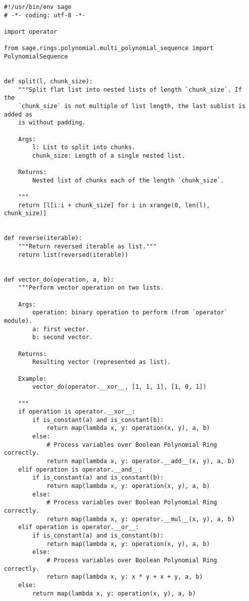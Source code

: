 
\begin{lstlisting}
#!/usr/bin/env sage
# -*- coding: utf-8 -*-

import operator

from sage.rings.polynomial.multi_polynomial_sequence import PolynomialSequence


def split(l, chunk_size):
    """Split flat list into nested lists of length `chunk_size`. If the
    `chunk_size` is not multiple of list length, the last sublist is added as
    is without padding.

    Args:
        l: List to split into chunks.
        chunk_size: Length of a single nested list.

    Returns:
        Nested list of chunks each of the length `chunk_size`.

    """
    return [l[i:i + chunk_size] for i in xrange(0, len(l), chunk_size)]


def reverse(iterable):
    """Return reversed iterable as list."""
    return list(reversed(iterable))


def vector_do(operation, a, b):
    """Perform vector operation on two lists.

    Args:
        operation: binary operation to perform (from `operator` module).
        a: first vector.
        b: second vector.

    Returns:
        Resulting vector (represented as list).

    Example:
        vector_do(operator.__xor__, [1, 1, 1], [1, 0, 1])

    """
    if operation is operator.__xor__:
        if is_constant(a) and is_constant(b):
            return map(lambda x, y: operation(x, y), a, b)
        else:
            # Process variables over Boolean Polynomial Ring correctly.
            return map(lambda x, y: operator.__add__(x, y), a, b)
    elif operation is operator.__and__:
        if is_constant(a) and is_constant(b):
            return map(lambda x, y: operation(x, y), a, b)
        else:
            # Process variables over Boolean Polynomial Ring correctly.
            return map(lambda x, y: operator.__mul__(x, y), a, b)
    elif operation is operator.__or__:
        if is_constant(a) and is_constant(b):
            return map(lambda x, y: operation(x, y), a, b)
        else:
            # Process variables over Boolean Polynomial Ring correctly.
            return map(lambda x, y: x * y + x + y, a, b)
    else:
        return map(lambda x, y: operation(x, y), a, b)



\end{lstlisting}

